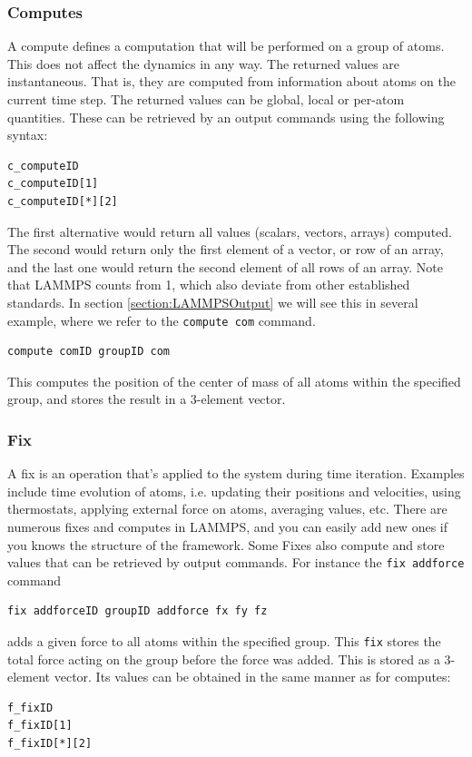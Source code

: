 \documentclass[twoside,english]{uiofysmaster}
\begin{document}
\subsubsection{Computes}
A compute defines a computation that will be performed on a group of atoms. 
This does not affect the dynamics in any way.
The returned values are instantaneous. 
That is, they are computed from information about atoms on the current time step. 
The returned  values can be global, local or per-atom quantities.
These can be retrieved by an output commands using the following syntax:
\begin{lstlisting}[language=LammpsInput]
c_computeID
c_computeID[1]
c_computeID[*][2]
\end{lstlisting} 
The first alternative would return all values (scalars, vectors, arrays) computed. 
The second would return only the first element of a vector, or row of an array, 
and the last one would return the second element of all rows of an array. 
Note that LAMMPS counts from 1, which also deviate from other established standards.
In section \ref{section:LAMMPSOutput} we will see this in several example, where we refer to the \texttt{compute com} command. 
\begin{lstlisting}[language=LammpsInput]
compute comID groupID com
\end{lstlisting} 
This computes the position of the center of mass of all atoms within the specified group, and stores the result in a 3-element vector.
 





\subsubsection{Fix}
A fix is an operation that's applied to the system during time iteration. 
Examples include time evolution of atoms, i.e. updating their positions and velocities, using thermostats, applying external force on atoms, averaging values, etc. 
There are numerous fixes and computes in LAMMPS, and you can easily add new ones if you knows the structure of the framework.
Some Fixes also compute and store values that can be retrieved by output commands. 
For instance the \texttt{fix addforce} command
\begin{lstlisting}[language=LammpsInput]
fix addforceID groupID addforce fx fy fz
\end{lstlisting} 
adds a given force to all atoms within the specified group. 
This \texttt{fix} stores the total force acting on the group before the force was added. 
This is stored as a 3-element vector.
Its values can be obtained in the same manner as for computes:
\begin{lstlisting}[language=LammpsInput]
f_fixID
f_fixID[1]
f_fixID[*][2]
\end{lstlisting} 
\end{document}
